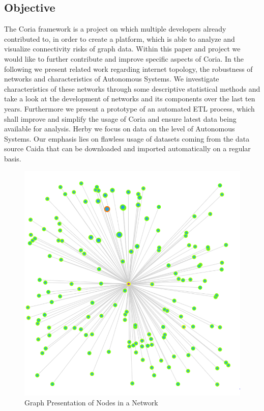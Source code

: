 \documentclass[conference, 11pt]{IEEEtran}
\begin{document}
\vspace{1cm}

   


 


\subsection{Objective}
The Coria framework is a project on which multiple developers already contributed to, in order to create a platform, which is able to analyze and visualize connectivity risks of graph data\cite{CoriaPaper}. Within this paper and project we would like to further contribute and improve specific aspects of Coria. In the following we present related work regarding internet topology, the robustness of networks and characteristics of Autonomous Systems. We investigate characteristics of these networks through some descriptive statistical methods and take a look at the development of networks and its components over the last ten years. Furthermore we present a prototype of an automated ETL process, which shall improve and simplify the usage of Coria and ensure latest data being available for analysis. Herby we focus on data on the level of Autonomous Systems. Our emphasis lies on flawless usage of datasets coming from the data source Caida that can be downloaded and imported automatically on a regular basis. \\


\vspace{0.5cm}
\begin{figure}[htbp]
\centerline{\includegraphics[scale=0.2]{Graphics/nodePresentaion.PNG}}
\caption{Graph Presentation of Nodes in a Network}
\label{fig}
\end{figure}
\vspace{0.5cm}
\end{document}
